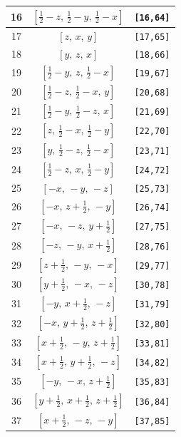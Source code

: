 \documentclass[fleqn,8pt]{jsarticle}
\begin{document}
\begin{longtable}{ccc}
16 & $\left[ \frac{1}{2} - z,\, \frac{1}{2} - y,\, \frac{1}{2} - x \right]$ & {\tt [16,64]} \\ \hline
17 & $\left[ z,\, x,\, y \right]$ & {\tt [17,65]} \\ \hline
18 & $\left[ y,\, z,\, x \right]$ & {\tt [18,66]} \\ \hline
19 & $\left[ \frac{1}{2} - y,\, z,\, \frac{1}{2} - x \right]$ & {\tt [19,67]} \\ \hline
20 & $\left[ \frac{1}{2} - z,\, \frac{1}{2} - x,\, y \right]$ & {\tt [20,68]} \\ \hline
21 & $\left[ \frac{1}{2} - y,\, \frac{1}{2} - z,\, x \right]$ & {\tt [21,69]} \\ \hline
22 & $\left[ z,\, \frac{1}{2} - x,\, \frac{1}{2} - y \right]$ & {\tt [22,70]} \\ \hline
23 & $\left[ y,\, \frac{1}{2} - z,\, \frac{1}{2} - x \right]$ & {\tt [23,71]} \\ \hline
24 & $\left[ \frac{1}{2} - z,\, x,\, \frac{1}{2} - y \right]$ & {\tt [24,72]} \\ \hline
25 & $\left[ - x,\, - y,\, - z \right]$ & {\tt [25,73]} \\ \hline
26 & $\left[ - x,\, z + \frac{1}{2},\, - y \right]$ & {\tt [26,74]} \\ \hline
27 & $\left[ - x,\, - z,\, y + \frac{1}{2} \right]$ & {\tt [27,75]} \\ \hline
28 & $\left[ - z,\, - y,\, x + \frac{1}{2} \right]$ & {\tt [28,76]} \\ \hline
29 & $\left[ z + \frac{1}{2},\, - y,\, - x \right]$ & {\tt [29,77]} \\ \hline
30 & $\left[ y + \frac{1}{2},\, - x,\, - z \right]$ & {\tt [30,78]} \\ \hline
31 & $\left[ - y,\, x + \frac{1}{2},\, - z \right]$ & {\tt [31,79]} \\ \hline
32 & $\left[ - x,\, y + \frac{1}{2},\, z + \frac{1}{2} \right]$ & {\tt [32,80]} \\ \hline
33 & $\left[ x + \frac{1}{2},\, - y,\, z + \frac{1}{2} \right]$ & {\tt [33,81]} \\ \hline
34 & $\left[ x + \frac{1}{2},\, y + \frac{1}{2},\, - z \right]$ & {\tt [34,82]} \\ \hline
35 & $\left[ - y,\, - x,\, z + \frac{1}{2} \right]$ & {\tt [35,83]} \\ \hline
36 & $\left[ y + \frac{1}{2},\, x + \frac{1}{2},\, z + \frac{1}{2} \right]$ & {\tt [36,84]} \\ \hline
37 & $\left[ x + \frac{1}{2},\, - z,\, - y \right]$ & {\tt [37,85]} \\ \hline

\end{longtable}
\end{document}
